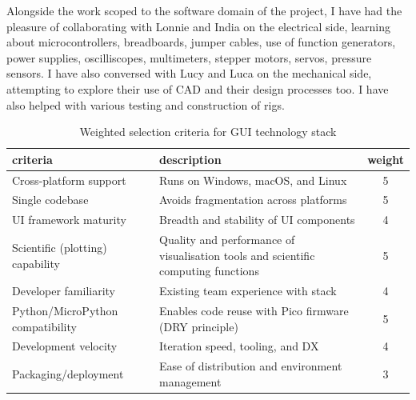 \documentclass[10pt, a4paper]{article}
\begin{document}
Alongside the work scoped to the software domain of the project, I have had the pleasure of collaborating with Lonnie and India on the electrical side, learning about microcontrollers, breadboards, jumper cables, use of function generators, power supplies, oscilliscopes, multimeters, stepper motors, servos, pressure sensors.
I have also conversed with Lucy and Luca on the mechanical side, attempting to explore their use of CAD and their design processes too.
I have also helped with various testing and construction of rigs.

\begin{table}[H]
  \small
  \centering
  \caption{Weighted selection criteria for GUI technology stack}
  \label{tab:weights}
  \begin{tabularx}{\textwidth}{XXc}
    \toprule
    criteria                         & description                                                                       & weight \\
    \midrule
    Cross-platform support           & Runs on Windows, macOS, and Linux                                                 & 5      \\
    Single codebase                  & Avoids fragmentation across platforms                                             & 5      \\
    UI framework maturity            & Breadth and stability of UI components                                            & 4      \\
    Scientific (plotting) capability & Quality and performance of visualisation tools and scientific computing functions & 5      \\
    Developer familiarity            & Existing team experience with stack                                               & 4      \\
    Python/MicroPython compatibility & Enables code reuse with Pico firmware (DRY principle)                             & 5      \\
    Development velocity             & Iteration speed, tooling, and DX                                                  & 4      \\
    Packaging/deployment             & Ease of distribution and environment management                                   & 3      \\
    \bottomrule
  \end{tabularx}
\end{table}
\end{document}
